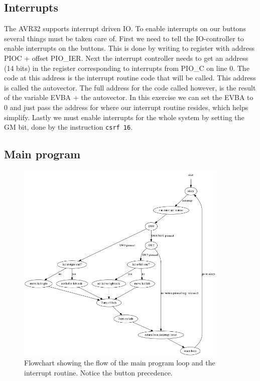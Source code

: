 \subsection{Interrupts}

The AVR32 supports interrupt driven IO. To enable interrupts on our buttons several things must be taken care of. First we need to tell the IO-controller to enable interrupts on the buttons. This is done by writing to register with address PIOC + offset PIO\_IER. Next the interrupt controller needs to get an address (14 bits) in the register corresponding to interrupts from PIO\_C on line 0. The code at this address is the interrupt routine code that will be called. This address is called the autovector. The full address for the code called however, is the result of the variable EVBA + the autovector. In this exercise we can set the EVBA to 0 and just pass the address for where our interrupt routine resides, which helps simplify. Lastly we must enable interrupts for the whole system by setting the GM bit, done by the instruction \texttt{csrf 16}.

\subsection{Main program}
\begin{figure}[here]
\includegraphics[width=0.9\textwidth]{img/graph.png}
\caption{Flowchart showing the flow of the main program loop and the interrupt routine. Notice the button precedence.}
\label{fig:mainflow}
\end{figure}

